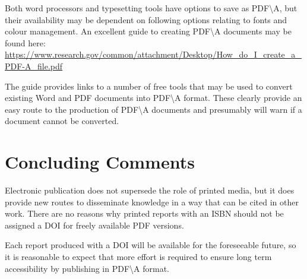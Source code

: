 \documentclass{article}
\begin{document}
Both word processors and typesetting tools have options to save as PDF\textbackslash A, but their availability may be dependent on following options relating to fonts and colour management. An excellent guide to creating PDF\textbackslash A  documents may be found here: \\ \url{https://www.research.gov/common/attachment/Desktop/How_do_I_create_a_PDF-A_file.pdf}
 
 The guide provides links to a number of free tools that may be used to convert existing Word and PDF documents into PDF\textbackslash A format. These clearly provide an easy route to the production of PDF\textbackslash A documents and presumably will warn if a document cannot be converted.
 
 \section{Concluding Comments}
 
Electronic publication does not supersede the role of printed media, but it does provide new routes to disseminate knowledge in a way that can be cited in other work. There are no reasons why printed reports with an ISBN should not be assigned a DOI for freely available PDF versions.

Each report produced with a DOI will be available for the foreseeable future, so it is reasonable to expect that more effort is required to ensure long term accessibility by publishing in PDF\textbackslash A format.





\end{document}
